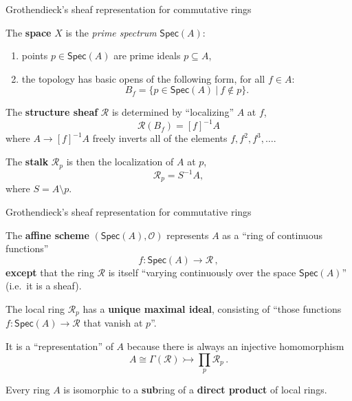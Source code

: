 \documentclass{beamer}
\newcommand{\myemph}[1]{\textbf{#1}}    %
\begin{document}
\begin{frame}{Grothendieck's sheaf representation for commutative rings}

The \myemph{space} $X$ is the \emph{prime spectrum} $\mathsf{Spec}(A)$:
 \begin{enumerate}
\item points $p\in \mathsf{Spec}(A)$ are prime ideals $p\subseteq A$,
\item the topology has basic opens of the following form, for all $f\in A$:
 $$B_f = \{ p\in \mathsf{Spec}(A)\ |\ f\not\in p \}.$$
\end{enumerate}
The \myemph{structure sheaf} $\mathcal {R}$ is determined by ``localizing'' $A$ at $f$,
\[
\mathcal{R}(B_f) = [f]^{-1}A
\]
where $A \rightarrow [f]^{-1}A$ freely inverts all of the elements $f, f^2, f^3, \dots$.
\medskip

The \myemph{stalk} $\mathcal {R}_p$ is then the localization of $A$ at $p$,
\[
\mathcal{R}_p = S^{-1}A, 
\]
where $S = A\setminus p$.

\end{frame}
\begin{frame}{Grothendieck's sheaf representation for commutative rings}

The \myemph{affine scheme} $(\mathsf{Spec}(A), \mathcal {O})$ represents $A$ as a ``ring of continuous functions'' 
\[
f : \mathsf{Spec}(A) \to \mathcal {R}\,,
\]
\myemph{except} that the ring $\mathcal{R}$ is itself ``varying continuously over the space $\mathsf{Spec}(A)$'' (i.e.\ it is a sheaf).  
\medskip

The local ring $\mathcal{R}_p$ has a \myemph{unique maximal ideal}, consisting of ``those functions  $f : \mathsf{Spec}(A) \to \mathcal{R}$ that vanish at $p$''.
\medskip

It is a ``representation'' of $A$ because there is always an injective homomorphism
\[
A \cong \Gamma(\mathcal{R}) \rightarrowtail \prod_{p}\mathcal{R}_p \,.
\]

\begin{corollary}
Every ring $A$ is isomorphic to a \myemph{sub}ring of a \myemph{direct product} of local rings.
\end{corollary}

\end{frame}
\end{document}
